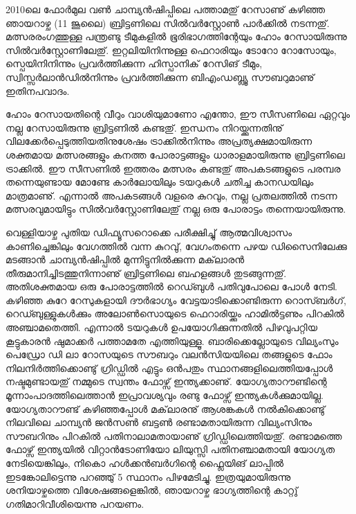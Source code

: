 ﻿
\vskip 2pt

2010ലെ ഫോര്‍മുല വണ്‍ ചാമ്പ്യന്‍ഷിപ്പിലെ പത്താമതു് റേസാണു് കഴിഞ്ഞ ഞായറാഴ്ച (11 ജൂലൈ) ബ്രിട്ടണിലെ സില്‍വര്‍സ്റ്റോണ്‍ പാര്‍ക്കില്‍ 
നടന്നതു്. മത്സരരംഗത്തുള്ള പന്ത്രണ്ടു ടീമുകളില്‍ ഭൂരിഭാഗത്തിന്റേയും ഹോം റേസായിരുന്നു സില്‍വര്‍സ്റ്റോണിലേതു്. ഇറ്റലിയിനിന്നുള്ള ഫെറാരിയും ടോറോ റോസോയും, സ്പെയിനിനിന്നും പ്രവര്‍ത്തിക്കുന്ന ഹിസ്പാനിക് റേസിങ് ടീമും, സ്വിസ്സര്‍ലാന്‍ഡില്‍നിന്നും പ്രവര്‍ത്തിക്കുന്ന ബിഎംഡബ്ല്യൂ സൗബറുമാണു് ഇതിനപവാദം.

ഹോം റേസായതിന്റെ വീറും വാശിയുമാണോ എന്തോ, ഈ സീസണിലെ ഏറ്റവും നല്ല റേസായിരുന്നു ബ്രിട്ടണില്‍ കണ്ടതു്.   
ഇന്ധനം നിറയ്ക്കുന്നതിനു് വിലക്കേര്‍പ്പെടുത്തിയതിനുശേഷം ട്രാക്കില്‍നിന്നും അപ്രത്യക്ഷമായിരുന്ന ശക്തമായ മത്സരങ്ങളും കനത്ത
 പോരാട്ടങ്ങളും ധാരാളമായിരുന്നു ബ്രിട്ടണിലെ ട്രാക്കില്‍. ഈ സീസണില്‍ ഇത്തരം മത്സരം കണ്ടതു് അപകടങ്ങളുടെ പരമ്പര 
 തന്നെയുണ്ടായ മോണ്ടേ കാര്‍ലോയിലും ടയറുകള്‍ ചതിച്ച കാനഡയിലും മാത്രമാണു്. എന്നാല്‍ അപകടങ്ങള്‍ വളരെ കുറവും, 
 നല്ല പ്രതലത്തില്‍ നടന്ന മത്സരവുമായിട്ടും സില്‍വര്‍സ്റ്റോണിലേതു് നല്ല ഒരു പോരാട്ടം തന്നെയായിരുന്നു.

വെള്ളിയാഴ്ച പുതിയ ഡിഫ്യൂസറൊക്കെ പരീക്ഷിച്ചു് ആത്മവിശ്വാസം കാണിച്ചെങ്കിലും വേഗത്തില്‍ വന്ന കുറവു്, വേഗംതന്നെ പഴയ 
ഡിസൈനിലേക്കു മടങ്ങാന്‍ ചാമ്പ്യന്‍ഷിപ്പില്‍ മുന്നിട്ടുനില്‍ക്കുന്ന മക്‌ലാരന്‍ തീരുമാനിച്ചിടത്തുനിന്നാണു് ബ്രിട്ടണിലെ ബഹളങ്ങള്‍ 
തുടങ്ങുന്നതു്. അതിശക്തമായ ഒരു പോരാട്ടത്തില്‍ റെഡ്ബുള്‍ പതിവുപോലെ പോള്‍ നേടി. കഴിഞ്ഞ കുറേ റേസുകളായി ദൗര്‍ഭാഗ്യം 
വേട്ടയാടിക്കൊണ്ടിരുന്ന റൊസ്ബര്‍ഗ്, റെഡ്ബുള്ളുകള്‍ക്കും അലോണ്‍സൊയുടെ ഫെറാരിയ്ക്കും ഹാമില്‍ട്ടണും പിറകില്‍ അഞ്ചാമതെത്തി. 
എന്നാല്‍ ടയറുകള്‍ ഉപയോഗിക്കുന്നതില്‍ പിഴവുപറ്റിയ കൂട്ടുകാരന്‍ ഷുമാക്കര്‍ പത്താമതേ എത്തിയുള്ളൂ. ബാരിക്കെല്ലോയുടെ വില്യംസും 
പെഡ്രോ ഡി ലാ റോസയുടെ സൗബറും വലന്‍സിയയിലെ തങ്ങളുടെ ഫോം നിലനിര്‍ത്തിക്കൊണ്ടു് ഗ്രിഡ്ഡില്‍ എട്ടും ഒന്‍പതും 
സ്ഥാനങ്ങളിലെത്തിയപ്പോള്‍ നഷ്ടമുണ്ടായതു് നമ്മുടെ സ്വന്തം ഫോഴ്സ് ഇന്ത്യക്കാണു്. യോഗ്യതാറൗണ്ടിന്റെ മൂന്നാംപാദത്തിലെത്താന്‍ 
ഇപ്രാവശ്യവും രണ്ടു ഫോഴ്സ് ഇന്ത്യകള്‍ക്കുമായില്ല. യോഗ്യതാറൗണ്ട് കഴിഞ്ഞപ്പോള്‍ മക്‌ലാരനു് ആശങ്കകള്‍ നല്‍കിക്കൊണ്ടു് നിലവിലെ 
ചാമ്പ്യന്‍ ജന്‍സണ്‍ ബട്ടണ്‍ രണ്ടാമതായിരുന്ന വില്യംസിനും സൗബറിനും പിറകില്‍ പതിനാലാമതായാണു് ഗ്രിഡ്ഡിലെത്തിയതു്. രണ്ടാമത്തെ 
ഫോഴ്സ് ഇന്ത്യയില്‍ വിറ്റാന്‍ടോണിയോ ലിയുസ്സി പതിനഞ്ചാമതായി യോഗ്യത നേടിയെങ്കിലും, നികൊ ഹള്‍ക്കന്‍ബര്‍ഗിന്റെ ഫ്ലൈയിങ് 
ലാപ്പില്‍ ഇടങ്കോലിട്ടെന്നു പറഞ്ഞു്  5 സ്ഥാനം പിഴമേടിച്ചു. ഇത്രയുമായിരുന്നു ശനിയാഴ്ചത്തെ വിശേഷങ്ങളെങ്കില്‍, ഞായറാഴ്ച ഭാഗ്യത്തിന്റെ 
കാറ്റു് ഗതിമാറിവീശിയെന്നു പറയണം.

